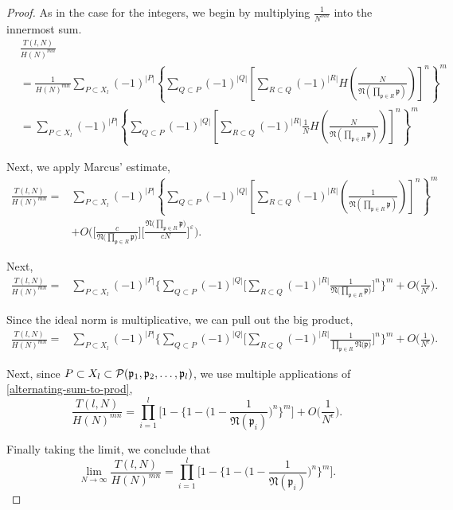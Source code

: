 \documentclass[10pt,a4paper]{article}
\theoremstyle{definition}
\theoremstyle{remark}
\newcommand{\f}[1]{\mathfrak{#1}}
\begin{document}
	\begin{proof}
	As in the case for the integers, we begin by multiplying \(\frac{1}{N^{mn}}\) into the innermost sum.
	\begin{align}
		&\frac{T(l,N)}{H(N)^{mn}} \\
		&= \frac{1}{H(N)^{mn}}\sum_{P\subset X_l}(-1)^{|P|} \left\{\sum_{Q\subset P} (-1)^{|Q|} \left[\sum_{R\subset Q}(-1)^{|R|}H\left(\frac{N}{\f{N}\left(\prod_{\f{p}\in R}\f{p}\right)}\right)\right]^n\right\}^m\\
		&=\sum_{P\subset X_l}(-1)^{|P|} \left\{\sum_{Q\subset P} (-1)^{|Q|} \left[\sum_{R\subset Q}(-1)^{|R|}\frac{1}{N}H\left(\frac{N}{\f{N}\left(\prod_{\f{p}\in R}\f{p}\right)}\right)\right]^n\right\}^m
	\end{align}

	Next, we apply Marcus' estimate,
	\begin{align}
		\frac{T(l,N)}{H(N)^{mn}}=&\sum_{P\subset X_l}(-1)^{|P|} \left\{\sum_{Q\subset P} (-1)^{|Q|} \left[\sum_{R\subset Q}(-1)^{|R|}\left(\frac{1}{\f{N}\left(\prod_{\f{p}\in R}\f{p}\right)}\right)\right]^n\right\}^m \\
		&+ O\Biggl(\Biggl[\frac{c}{\f{N}\bigl(\prod_{\f{p}\in R}\f{p}\bigr)}\Biggl]\Biggr[\frac{\f{N}\bigl(\prod_{\f{p}\in R}\f{p}\bigr)}{cN}\Biggr]^{\varepsilon}\Biggr).
	\end{align}

	Next,
	\begin{equation}
	\begin{split}
		\frac{T(l,N)}{H(N)^{mn}}=&\sum_{P\subset X_l}(-1)^{|P|} \Big\{\sum_{Q\subset P} (-1)^{|Q|} \Big[\sum_{R\subset Q}(-1)^{|R|}\frac{1}{\f{N}\Big(\prod_{\f{p}\in R}\f{p}\Big)} \Big]^n\Big\}^m + O\Big(\frac{1}{N^{\epsilon}}\Big).
	\end{split}
	\end{equation}

	Since the ideal norm is multiplicative, we can pull out the big product,
	\begin{equation}
	\begin{split}
		\frac{T(l,N)}{H(N)^{mn}}=&\sum_{P\subset X_l}(-1)^{|P|} \Biggl\{\sum_{Q\subset P} (-1)^{|Q|} \Biggl[\sum_{R\subset Q}(-1)^{|R|}\frac{1}{\prod_{\f{p}\in R}\f{N}\bigl(\f{p}\bigr)}\Biggr]^n\Biggr\}^m + O\Big(\frac{1}{N^{\epsilon}}\Big).
	\end{split}
        \end{equation}

	Next, since \(P\subset X_l \subset \mathcal{P}(\f{p}_1,\f{p}_2,\mathellipsis,\f{p}_l)\), we use multiple applications of \cref{alternating-sum-to-prod},
		$$\frac{T(l,N)}{H(N)^{mn}}=\prod_{i=1}^{l}\Biggr[1-\Biggr\{1-\Biggl(1-\frac{1}{\f{N}(\f{p}_i)}\Biggr)^n\Biggr\}^m\Biggr] + O\Big(\frac{1}{N^{\epsilon}}\Big).$$
		
	Finally taking the limit, we conclude that
	$$\lim_{N\to\infty} \frac{T(l,N)}{H(N)^{mn}} = \prod_{i=1}^{l}\Big[1-\Big\{1-\Big(1-\frac{1}{\f{N}(\f{p}_i)}\Big)^n\Big\}^m\Big].$$
\end{proof}
\end{document}
